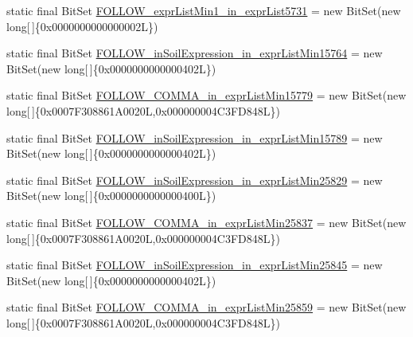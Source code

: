 \begin{DoxyCompactItemize}
\item 
static final Bit\-Set \hyperlink{classorg_1_1tzi_1_1use_1_1parser_1_1shell_1_1_shell_command_parser_a52db767fe35741f89a8fb36a1af4b701}{F\-O\-L\-L\-O\-W\-\_\-expr\-List\-Min1\-\_\-in\-\_\-expr\-List5731} = new Bit\-Set(new long\mbox{[}$\,$\mbox{]}\{0x0000000000000002\-L\})
\item 
static final Bit\-Set \hyperlink{classorg_1_1tzi_1_1use_1_1parser_1_1shell_1_1_shell_command_parser_a84e779bac9b808da32fe022cb3f28da9}{F\-O\-L\-L\-O\-W\-\_\-in\-Soil\-Expression\-\_\-in\-\_\-expr\-List\-Min15764} = new Bit\-Set(new long\mbox{[}$\,$\mbox{]}\{0x0000000000000402\-L\})
\item 
static final Bit\-Set \hyperlink{classorg_1_1tzi_1_1use_1_1parser_1_1shell_1_1_shell_command_parser_a35d07a164dc8cab7370175989c1f01d4}{F\-O\-L\-L\-O\-W\-\_\-\-C\-O\-M\-M\-A\-\_\-in\-\_\-expr\-List\-Min15779} = new Bit\-Set(new long\mbox{[}$\,$\mbox{]}\{0x0007\-F308861\-A0020\-L,0x000000004\-C3\-F\-D848\-L\})
\item 
static final Bit\-Set \hyperlink{classorg_1_1tzi_1_1use_1_1parser_1_1shell_1_1_shell_command_parser_a3809b590fc8bd7a469df24581344d1db}{F\-O\-L\-L\-O\-W\-\_\-in\-Soil\-Expression\-\_\-in\-\_\-expr\-List\-Min15789} = new Bit\-Set(new long\mbox{[}$\,$\mbox{]}\{0x0000000000000402\-L\})
\item 
static final Bit\-Set \hyperlink{classorg_1_1tzi_1_1use_1_1parser_1_1shell_1_1_shell_command_parser_a8e2077636b642f6ac249837cd631719c}{F\-O\-L\-L\-O\-W\-\_\-in\-Soil\-Expression\-\_\-in\-\_\-expr\-List\-Min25829} = new Bit\-Set(new long\mbox{[}$\,$\mbox{]}\{0x0000000000000400\-L\})
\item 
static final Bit\-Set \hyperlink{classorg_1_1tzi_1_1use_1_1parser_1_1shell_1_1_shell_command_parser_a08cc722eb8def0deb28644f53df748dc}{F\-O\-L\-L\-O\-W\-\_\-\-C\-O\-M\-M\-A\-\_\-in\-\_\-expr\-List\-Min25837} = new Bit\-Set(new long\mbox{[}$\,$\mbox{]}\{0x0007\-F308861\-A0020\-L,0x000000004\-C3\-F\-D848\-L\})
\item 
static final Bit\-Set \hyperlink{classorg_1_1tzi_1_1use_1_1parser_1_1shell_1_1_shell_command_parser_a5551cfd857f098d26ac970142d78056f}{F\-O\-L\-L\-O\-W\-\_\-in\-Soil\-Expression\-\_\-in\-\_\-expr\-List\-Min25845} = new Bit\-Set(new long\mbox{[}$\,$\mbox{]}\{0x0000000000000402\-L\})
\item 
static final Bit\-Set \hyperlink{classorg_1_1tzi_1_1use_1_1parser_1_1shell_1_1_shell_command_parser_af34ee19a07286e044cd28e55b77645b7}{F\-O\-L\-L\-O\-W\-\_\-\-C\-O\-M\-M\-A\-\_\-in\-\_\-expr\-List\-Min25859} = new Bit\-Set(new long\mbox{[}$\,$\mbox{]}\{0x0007\-F308861\-A0020\-L,0x000000004\-C3\-F\-D848\-L\})

\end{DoxyCompactItemize}
